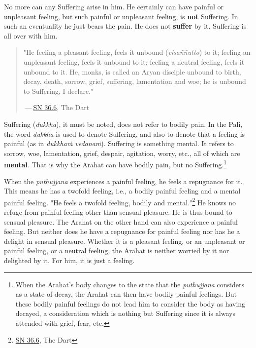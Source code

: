 No more can any Suffering
arise in him. He certainly can have painful or unpleasant feeling, but
such painful or unpleasant feeling, is \textbf{not} Suffering. In such an
eventuality he just bears the pain. He does not \textbf{suffer} by it.
Suffering is all over with him.


\begin{quotation}
"He feeling a pleasant feeling, feels it
unbound (\emph{visaññutto}) to it; feeling an unpleasant feeling, feels it
unbound to it; feeling a neutral feeling, feels it unbound to it. He,
monks, is called an Aryan disciple unbound to birth, decay, death,
sorrow, grief, suffering, lamentation and woe; he is unbound to
Suffering, I declare."


 — \href{https://suttacentral.net/sn36.6/en/bodhi}{SN 36.6}, The Dart


\end{quotation}

Suffering (\emph{dukkha}), it must be noted, does not refer to bodily pain.
In the Pali, the word \emph{dukkha} is used to denote Suffering, and also to
denote that a feeling is painful (as in \emph{dukkhaṁ vedanaṁ}). Suffering
is something mental. It refers to sorrow, woe, lamentation, grief,
despair, agitation, worry, etc., all of which are \textbf{mental}. That is
why the Arahat can have bodily pain, but no Suffering.\footnote{When the Arahat’s body changes to the state that the \emph{puthujjana} considers as a state of decay, the Arahat can then have bodily painful feelings. But these bodily painful feelings do not lead him to consider the body as having decayed, a consideration which is nothing but Suffering since it is always attended with grief, fear, etc.}


When the \emph{puthujjana} experiences a painful feeling, he feels a
repugnance for it. This means he has a twofold feeling, i.e., a bodily
painful feeling and a mental painful feeling. "He feels a twofold
feeling, bodily and mental."\footnote{\href{https://suttacentral.net/sn36.6/en/bodhi}{SN 36.6}, The Dart}
He knows no refuge from
painful feeling other than sensual pleasure. He is thus bound to sensual
pleasure. The Arahat on the other hand can also experience a painful
feeling. But neither does he have a repugnance for painful feeling nor
has he a delight in sensual pleasure. Whether it is a pleasant feeling,
or an unpleasant or painful feeling, or a neutral feeling, the Arahat is
neither worried by it nor delighted by it. For him, it is just a
feeling.


